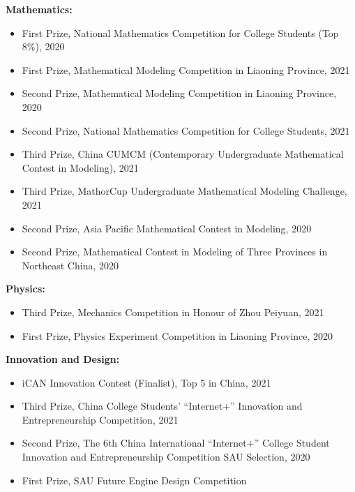 \documentclass[11pt]{article}
\begin{document}
\vspace{3mm}

\noindent\textbf{Mathematics:}
\begin{itemize}[leftmargin=*,itemsep=1pt]
    \item First Prize, National Mathematics Competition for College Students (Top 8\%), 2020
    \item First Prize, Mathematical Modeling Competition in Liaoning Province, 2021
    \item Second Prize, Mathematical Modeling Competition in Liaoning Province, 2020
    \item Second Prize, National Mathematics Competition for College Students, 2021
    \item Third Prize, China CUMCM (Contemporary Undergraduate Mathematical Contest in Modeling), 2021
    \item Third Prize, MathorCup Undergraduate Mathematical Modeling Challenge, 2021
    \item Second Prize, Asia Pacific Mathematical Contest in Modeling, 2020
    \item Second Prize, Mathematical Contest in Modeling of Three Provinces in Northeast China, 2020
\end{itemize}

\vspace{3mm}

\noindent\textbf{Physics:}
\begin{itemize}[leftmargin=*,itemsep=1pt]
    \item Third Prize, Mechanics Competition in Honour of Zhou Peiyuan, 2021
    \item First Prize, Physics Experiment Competition in Liaoning Province, 2020
\end{itemize}

\vspace{3mm}

\noindent\textbf{Innovation and Design:}
\begin{itemize}[leftmargin=*,itemsep=1pt]
    \item iCAN Innovation Contest (Finalist), Top 5 in China, 2021
    \item Third Prize, China College Students' “Internet+” Innovation and Entrepreneurship Competition, 2021
    \item Second Prize, The 6th China International “Internet+” College Student Innovation and Entrepreneurship Competition SAU Selection, 2020
    \item First Prize, SAU Future Engine Design Competition
\end{itemize}
\end{document}
